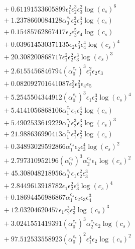 \documentclass[10pt]{article}
\begin{document}
\begin{align*}
&{}  + 0.61191533605899 \epsilon_{1}^{2} \epsilon_{2}^{3} \epsilon_{3}^{2} \log{\left(c_{s} \right)}^{6} \\
&{}  + 1.2378660084128 \alpha_{0}^{c_s} \epsilon_{2}^{3} \epsilon_{3}^{3} \log{\left(c_{s} \right)} \\
&{}  + 0.15485762867417 \epsilon_{2} \epsilon_{3}^{5} \epsilon_{4} \log{\left(c_{s} \right)} \\
&{}  + 0.039614530371135 \epsilon_{2} \epsilon_{3}^{2} \epsilon_{4}^{4} \log{\left(c_{s} \right)}^{4} \\
&{}  + 20.308200868717 \epsilon_{1}^{2} \epsilon_{2}^{2} \epsilon_{3}^{3} \log{\left(c_{s} \right)}^{3} \\
&{}  + 2.6155456846794 \left(\alpha_{0}^{c_s}\right)^{3} \epsilon_{1}^{2} \epsilon_{2} \epsilon_{3} \\
&{}  + 0.082092701641087 \epsilon_{2}^{3} \epsilon_{3}^{2} \epsilon_{4} \epsilon_{5} \\
&{}  + 5.2545504344912 \left(\alpha_{0}^{c_s}\right)^{3} \epsilon_{1} \epsilon_{2}^{3} \log{\left(c_{s} \right)}^{4} \\
&{}  + 5.4141056868106 \alpha_{1}^{c_s} \epsilon_{1} \epsilon_{2}^{4} \log{\left(c_{s} \right)} \\
&{}  + 5.4902533619229 \alpha_{0}^{c_s} \epsilon_{2}^{3} \epsilon_{3}^{3} \log{\left(c_{s} \right)}^{3} \\
&{}  + 21.988636990413 \alpha_{1}^{c_s} \epsilon_{1}^{3} \epsilon_{2}^{2} \log{\left(c_{s} \right)} \\
&{}  + 0.34893029592866 \alpha_{1}^{c_s} \epsilon_{2} \epsilon_{3}^{4} \log{\left(c_{s} \right)}^{2} \\
&{}  + 2.797310952196 \left(\alpha_{0}^{c_s}\right)^{3} \alpha_{2}^{c_s} \epsilon_{1} \log{\left(c_{s} \right)}^{2} \\
&{}  + 45.308048218956 \alpha_{0}^{c_s} \epsilon_{1} \epsilon_{2}^{2} \epsilon_{3}^{3} \\
&{}  + 2.8449613918782 \epsilon_{1} \epsilon_{2}^{2} \epsilon_{3}^{4} \log{\left(c_{s} \right)}^{4} \\
&{}  + 0.18694456986867 \alpha_{1}^{c_s} \epsilon_{2} \epsilon_{3} \epsilon_{4}^{3} \\
&{}  + 12.03204620457 \epsilon_{1} \epsilon_{2}^{3} \epsilon_{3}^{3} \log{\left(c_{s} \right)}^{3} \\
&{}  + 3.0241551419391 \left(\alpha_{0}^{c_s}\right)^{3} \alpha_{2}^{c_s} \epsilon_{2} \log{\left(c_{s} \right)} \\
&{}  + 97.512533558923 \left(\alpha_{0}^{c_s}\right)^{2} \epsilon_{1}^{4} \epsilon_{2} \log{\left(c_{s} \right)}^{2} \\

\end{align*}
\end{document}

